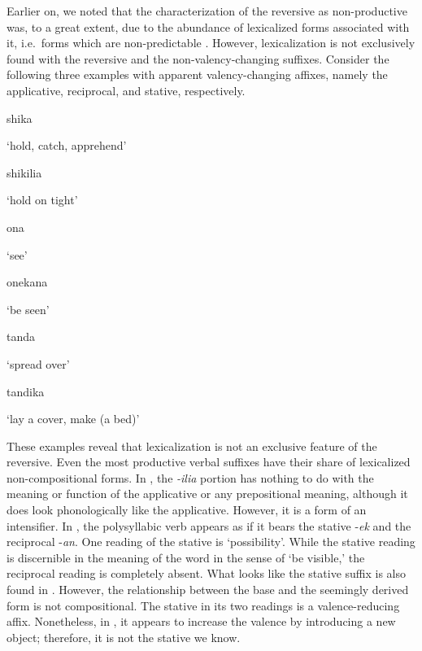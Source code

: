 \documentclass[output=paper]{langsci/langscibook}
\begin{document}
Earlier on, we noted that the characterization of the reversive as non-productive was, to a great extent, due to the abundance of lexicalized forms associated with it, i.e.\ forms which are non-predictable \citep{Shepardson1986}. However, lexicalization is not exclusively found with the reversive and the non-valency-changing suffixes. Consider the following three examples with apparent valency-changing affixes, namely the applicative, reciprocal, and stative, respectively. 

\ea\label{ex:ngonyaningowa:11}
\ea\label{ex:ngonyaningowa:11a}
{shika}

  ‘hold, catch, apprehend’

\ex\label{ex:ngonyaningowa:11b} 
shikilia

  ‘hold on tight’
\z
\z 

\ea\label{ex:ngonyaningowa:12}
\ea\label{ex:ngonyaningowa:12a}
ona

  ‘see’

\ex\label{ex:ngonyaningowa:12b}  
onekana

  ‘be seen’
\z 
\z 

\ea\label{ex:ngonyaningowa:13}
\ea\label{ex:ngonyaningowa:13a}
tanda

  ‘spread over’

\ex\label{ex:ngonyaningowa:13b}  
tandika

 ‘lay a cover, make (a bed)’
\z 
\z

These examples reveal that lexicalization is not an exclusive feature of the reversive. Even the most productive verbal suffixes have their share of lexicalized non-compositional forms. In , the \textit{{}-ilia} portion has nothing to do with the meaning or function of the applicative or any prepositional meaning, although it does look phonologically like the applicative. However, it is a form of an intensifier. In , the polysyllabic verb appears as if it bears the stative -\textit{ek} and the reciprocal -\textit{an}. One reading of the stative is ‘possibility’. While the stative reading is discernible in the meaning of the word in the sense of ‘be visible,’ the reciprocal reading is completely absent. What looks like the stative suffix is also found in . However, the relationship between the base  and the seemingly derived form  is not compositional. The stative in its two readings is a valence-reducing affix. Nonetheless, in , it appears to increase the valence by introducing a new object; therefore, it is not the stative we know. 
\end{document}
